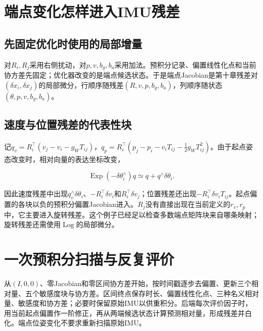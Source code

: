 \section{端点变化怎样进入IMU残差}

\subsection{先固定优化时使用的局部增量}

对$R_i,R_j$采用右侧扰动，对$p,v,b_g,b_a$采用加法。预积分记录、偏置线性化点和当前协方差先固定；优化器改变的是端点候选状态。于是端点Jacobian是第十章残差对$(\delta x_i,\delta x_j)$的局部微分，行顺序随残差$(R,v,p,b_g,b_a)$，列顺序随状态$(\theta,p,v,b_g,b_a)$。

\subsection{速度与位置残差的代表性块}

记$q_v=R_i^\top(v_j-v_i-g_WT_{ij})$，$q_p=R_i^\top(p_j-p_i-v_iT_{ij}-\tfrac12g_WT_{ij}^2)$。由于起点姿态改变时，相对向量的表达坐标改变，

\begin{equation*}
\operatorname{Exp}(-\delta\theta_i^\wedge)q
\simeq q+q^\wedge\delta\theta_i.
\end{equation*}

因此速度残差中出现$q_v^\wedge\delta\theta_i$、$-R_i^\top\delta v_i$和$R_i^\top\delta v_j$；位置残差还出现$-R_i^\top\delta v_iT_{ij}$。起点偏置的各块以负的预积分偏置Jacobian进入。$R_j$没有直接出现在当前定义的$r_v,r_p$中，它主要进入旋转残差。这个例子已经足以检查多数端点矩阵块来自哪条映射；旋转残差还需使用$\operatorname{Log}$的局部微分。

\section{一次预积分扫描与反复评价}

从$(I,0,0)$、零Jacobian和零区间协方差开始，按时间戳逐步去偏置、更新三个相对量、五个敏感度块与协方差。区间终点保存时长、偏置线性化点、三种名义相对量、敏感度和协方差；必要时保留原始IMU以供重积分。后端每次评价因子时，用当前起点偏置作一阶修正，再从两端候选状态计算预测相对量，形成残差并白化。端点位姿变化不要求重新扫描原始IMU。

